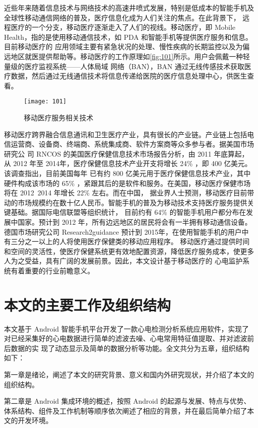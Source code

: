 近些年来随着信息技术与网络技术的高速井喷式发展，特别是低成本的智能手机及全球性移动通信网络的普及，医疗信息化成为人们关注的焦点。在此背景下，
远程医疗的一个分支，移动医疗逐渐走入了人们的视线\cite{2}。移动医疗，即 Mobile Health，指的是使用移动通信技术，如 PDA 和智能手机等提供医疗服务和信息。目前移动医疗的
应用领域主要有紧急状况的处理、慢性疾病的长期监控以及为偏远地区就医提供帮助等。移动医疗的工作原理如\autoref{fig:101}所示。用户会佩戴一种轻量级的医疗监视系统——人体局域
网络（BAN），BAN 通过无线传感技术获取医疗数据，然后通过无线通信技术将信息传递给医院的医疗信息处理中心，供医生查看。

\begin{figure}[htbp]
    \centering
    \texttt{[image: 101]}
    \caption{\label{fig:101}移动医疗服务相关技术}
\end{figure}

移动医疗跨界融合信息通讯和卫生医疗产业，具有很长的产业链\cite{3}。产业链上包括电信运营商、设备商、终端商、系统集成商、软件方案商等众多参与者。据美国市场研究公
司 RNCOS 的美国医疗保健信息技术市场报告分析，由 2011 年底算起，从 2012 年至 2014年，医疗保健信息技术产业开支将增长 24\% ，即 400 亿美元。该调查指出，目前美国每年
已有约 800 亿美元用于医疗保健信息技术产业，其中硬件构成该市场的 65\% ，紧跟其后的是软件和服务。在美国，移动医疗保健市场将在 2012~2014 年增长 22\% 左右。而在中国，
据业界人士预测，移动医疗目前带动的市场规模约在数十亿人民币。智能手机的普及为移动技术支持医疗服务提供关键基础。据国际电信联盟等组织统计，
目前约有 64\% 的智能手机用户都分布在发展中国家。预计到 2012 年，所有边远地区的居民将会有一半拥有移动通信设备。
德国市场研究公司 Research2guidance 预计到 2015年，在使用智能手机的用户中有三分之一以上的人将使用医疗保健类的移动应用程序。
移动医疗通过提供时间和空间的灵活性，使医疗保健系统更有效地配置资源，降低医疗服务成本，使更多人为之受益，具有广阔的发展前景。因此，本文设计基于移动医疗的
心电监护系统有着重要的行业前瞻意义。

\section{本文的主要工作及组织结构}
本文基于 Android 智能手机平台开发了一款心电检测分析系统应用软件，实现了对已经采集好的心电数据进行简单的滤波去噪、心电常用特征值提取、并对滤波前后数据的实
现了动态显示及简单的数据分析等功能。全文共分为五章，组织结构如下：

第一章是绪论，阐述了本文的研究背景、意义和国内外研究现状，并介绍了本文的组织结构。

第二章是 Android 集成环境的概述，按照 Android 的起源与发展、特点与优势、体系结构、组件及工作机制等顺序依次阐述了相应的背景，并在最后简单介绍了本文的开发环境。

